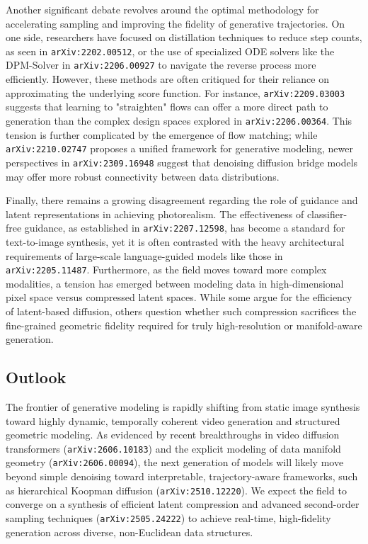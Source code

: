 \documentclass[11pt]{article}
\begin{document}
Another significant debate revolves around the optimal methodology for accelerating sampling and improving the fidelity of generative trajectories. On one side, researchers have focused on distillation techniques to reduce step counts, as seen in \texttt{arXiv:2202.00512}, or the use of specialized ODE solvers like the DPM-Solver in \texttt{arXiv:2206.00927} to navigate the reverse process more efficiently. However, these methods are often critiqued for their reliance on approximating the underlying score function. For instance, \texttt{arXiv:2209.03003} suggests that learning to "straighten" flows can offer a more direct path to generation than the complex design spaces explored in \texttt{arXiv:2206.00364}. This tension is further complicated by the emergence of flow matching; while \texttt{arXiv:2210.02747} proposes a unified framework for generative modeling, newer perspectives in \texttt{arXiv:2309.16948} suggest that denoising diffusion bridge models may offer more robust connectivity between data distributions.

Finally, there remains a growing disagreement regarding the role of guidance and latent representations in achieving photorealism. The effectiveness of classifier-free guidance, as established in \texttt{arXiv:2207.12598}, has become a standard for text-to-image synthesis, yet it is often contrasted with the heavy architectural requirements of large-scale language-guided models like those in \texttt{arXiv:2205.11487}. Furthermore, as the field moves toward more complex modalities, a tension has emerged between modeling data in high-dimensional pixel space versus compressed latent spaces. While some argue for the efficiency of latent-based diffusion, others question whether such compression sacrifices the fine-grained geometric fidelity required for truly high-resolution or manifold-aware generation.

\subsection{Outlook}

The frontier of generative modeling is rapidly shifting from static image synthesis toward highly dynamic, temporally coherent video generation and structured geometric modeling. As evidenced by recent breakthroughs in video diffusion transformers (\texttt{arXiv:2606.10183}) and the explicit modeling of data manifold geometry (\texttt{arXiv:2606.00094}), the next generation of models will likely move beyond simple denoising toward interpretable, trajectory-aware frameworks, such as hierarchical Koopman diffusion (\texttt{arXiv:2510.12220}). We expect the field to converge on a synthesis of efficient latent compression and advanced second-order sampling techniques (\texttt{arXiv:2505.24222}) to achieve real-time, high-fidelity generation across diverse, non-Euclidean data structures.
\end{document}
